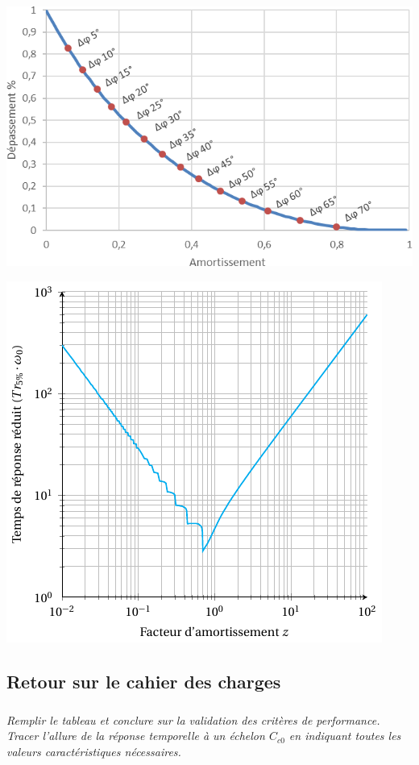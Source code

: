 \documentclass[10pt,fleqn]{article} %
\begin{document}
\begin{multicols}{2}
\begin{center}
\includegraphics[width=.9\linewidth]{images/abaque}
\end{center}

\begin{center}
\includegraphics[width=.8\linewidth]{images/abaque_tr}
\end{center}

\fi

\subsection*{Retour sur le cahier des charges}
\subparagraph{}
\textit{Remplir le tableau et conclure sur la validation des critères de performance.
Tracer l’allure de la réponse temporelle à un échelon $C_{c0}$ en indiquant toutes les valeurs caractéristiques nécessaires.}


\end{multicols}
\end{document}
